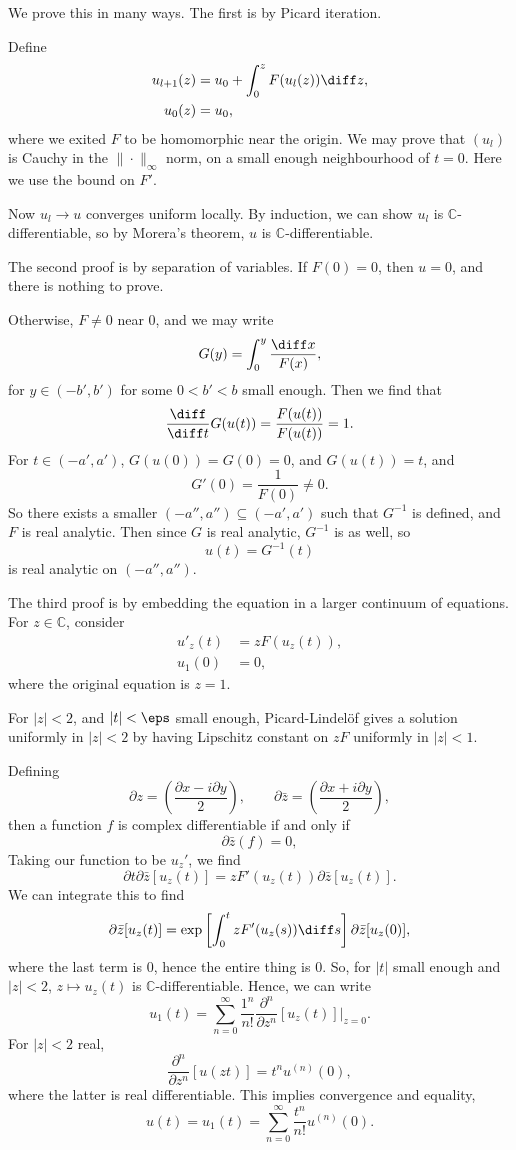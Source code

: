 \documentclass[12pt]{article}
\begin{document}

\begin{proofbox}
	We prove this in many ways. The first is by Picard iteration.

	Define
	\begin{align*}
		u_{l+1}(z) &= u_0 + \int_0^z F(u_l(z)) \diff z, \\
		u_0(z) &= u_0,
	\end{align*}
	where we exited $F$ to be homomorphic near the origin. We may prove that $(u_l)$ is Cauchy in the $\|\cdot\|_\infty$ norm, on a small enough neighbourhood of $t = 0$. Here we use the bound on $F'$.

	Now $u_l \to u$ converges uniform locally. By induction, we can show $u_l$ is $\mathbb{C}$-differentiable, so by Morera's theorem, $u$ is $\mathbb{C}$-differentiable.

	The second proof is by separation of variables. If $F(0) = 0$, then $u = 0$, and there is nothing to prove.

	Otherwise, $F \neq 0$ near $0$, and we may write
	\[
	G(y) = \int_0^y \frac{\diff x}{F(x)},
	\]
	for $y \in (-b', b')$ for some $0 < b' < b$ small enough. Then we find that
	\[
	\frac{\diff}{\diff t} G(u(t)) = \frac{F(u(t))}{F(u(t))} = 1.
	\]
	For $t \in (-a', a')$, $G(u(0)) = G(0) = 0$, and $G(u(t)) = t$, and
	\[
	G'(0) = \frac{1}{F(0)} \neq 0.
	\]
	So there exists a smaller $(-a'', a'') \subseteq (-a', a')$ such that $G^{-1}$ is defined, and $F$ is real analytic. Then since $G$ is real analytic, $G^{-1}$ is as well, so
	\[
	u(t) = G^{-1}(t)
	\]
	is real analytic on $(-a'', a'')$.

	The third proof is by embedding the equation in a larger continuum of equations. For $z \in \mathbb{C}$, consider
	\begin{align*}
		u'_z(t) &= z F(u_z(t)), \\
		u_1(0) &= 0,
	\end{align*}
	where the original equation is $z = 1$.

	For $|z| < 2$, and $|t| < \eps$ small enough, Picard-Lindel\"of gives a solution uniformly in $|z| < 2$ by having Lipschitz constant on $zF$ uniformly in $|z| < 1$.

	Defining
	\[
	\partial z = \left( \frac{\partial x - i \partial y}{2} \right), \qquad \partial \bar z = \left( \frac{\partial x + i \partial y}{2}\right),
	\]
	then a function $f$ is complex differentiable if and only if
	\[
	\partial \bar z(f) = 0,
	\]
	Taking our function to be $u_z'$, we find
	 \[
		 \partial t \partial \bar z [u_z(t)] = z F'(u_z(t)) \partial \bar z[u_z(t)].
	\]
	We can integrate this to find
	\[
		\partial \bar z[u_z(t)] = \exp \left[ \int_0^t z F'(u_z(s)) \diff s \right] \partial \bar z[u_z(0)],
	\]
	where the last term is 0, hence the entire thing is 0. So, for $|t|$ small enough and $|z| < 2$, $z \mapsto u_z(t)$ is $\mathbb{C}$-differentiable. Hence, we can write
	\[
	u_1(t) = \sum_{n = 0}^\infty \frac{1^n}{n!} \frac{\partial^n}{\partial z^n} [u_z(t)] \biggr|_{z = 0}.
	\]
	For $|z| < 2$ real,
	\[
		\frac{\partial^n}{\partial z^n} [u(zt)] = t^n u^{(n)}(0),
	\]
	where the latter is real differentiable. This implies convergence and equality,
	\[
	u(t) = u_1(t) = \sum_{n = 0}^{\infty} \frac{t^n}{n!} u^{(n)}(0).
	\]


\end{proofbox}
\end{document}
